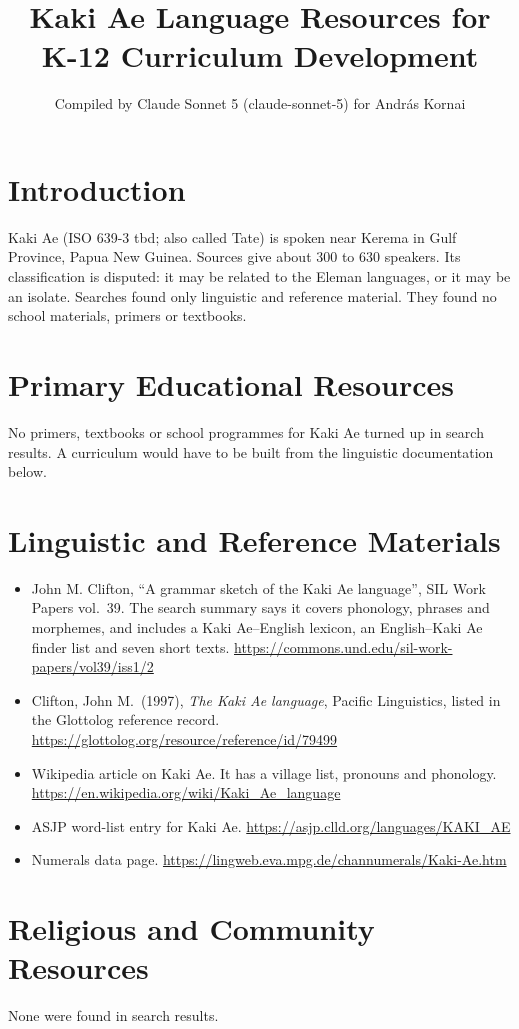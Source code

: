 \documentclass[12pt]{article}
\title{Kaki Ae Language Resources for K-12 Curriculum Development}
\author{Compiled by Claude Sonnet 5 (claude-sonnet-5) for Andr\'as Kornai}
\date{}
\begin{document}
\maketitle

\section{Introduction}
Kaki Ae (ISO 639-3 tbd; also called Tate) is spoken near Kerema in Gulf Province, Papua New Guinea. Sources give about 300 to 630 speakers. Its classification is disputed: it may be related to the Eleman languages, or it may be an isolate. Searches found only linguistic and reference material. They found no school materials, primers or textbooks.

\section{Primary Educational Resources}
No primers, textbooks or school programmes for Kaki Ae turned up in search results. A curriculum would have to be built from the linguistic documentation below.

\section{Linguistic and Reference Materials}
\begin{itemize}
\item John M. Clifton, ``A grammar sketch of the Kaki Ae language'', SIL Work Papers vol.\ 39. The search summary says it covers phonology, phrases and morphemes, and includes a Kaki Ae--English lexicon, an English--Kaki Ae finder list and seven short texts. \url{https://commons.und.edu/sil-work-papers/vol39/iss1/2}
\item Clifton, John M.\ (1997), \emph{The Kaki Ae language}, Pacific Linguistics, listed in the Glottolog reference record. \url{https://glottolog.org/resource/reference/id/79499}
\item Wikipedia article on Kaki Ae. It has a village list, pronouns and phonology. \url{https://en.wikipedia.org/wiki/Kaki_Ae_language}
\item ASJP word-list entry for Kaki Ae. \url{https://asjp.clld.org/languages/KAKI_AE}
\item Numerals data page. \url{https://lingweb.eva.mpg.de/channumerals/Kaki-Ae.htm}
\end{itemize}

\section{Religious and Community Resources}
None were found in search results.
\end{document}
